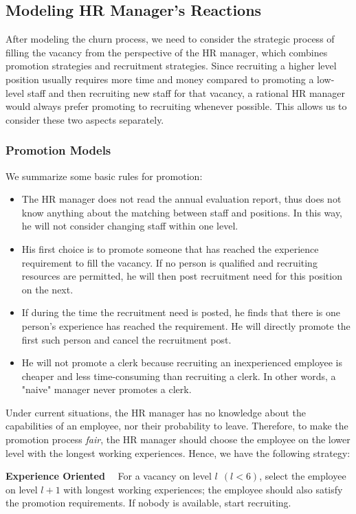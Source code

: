 \documentclass[tcn = 37075, sheet = false, abstract = false]{mcmthesis}
\begin{document}
	\subsection{Modeling HR Manager's Reactions}
	
	After modeling the churn process, we need to consider the strategic process of filling the vacancy from the perspective of the HR manager, which combines promotion strategies and recruitment strategies. Since recruiting a higher level position usually requires more time and money compared to promoting a low-level staff and then recruiting new staff for that vacancy, a rational HR manager would always prefer promoting to recruiting whenever possible. This allows us to consider these two aspects separately.
	
	\subsubsection{Promotion Models}
	We summarize some basic rules for promotion:
	\begin{itemize}
		\item The HR manager does not read the annual evaluation report, thus does not know anything about the matching between staff and positions. In this way, he will not consider changing staff within one level.
		\item His first choice is to promote someone that has reached the experience requirement to fill the vacancy. If no person is qualified and recruiting resources are permitted, he will then post recruitment need for this position on the next.
		\item If during the time the recruitment need is posted, he finds that there is one person's experience has reached the requirement. He will directly promote the first such person and cancel the recruitment post.
		\item He will not promote a clerk because recruiting an inexperienced employee is cheaper and less time-consuming than recruiting a clerk. In other words, a "naive" manager never promotes a clerk.
	\end{itemize}
	
	Under current situations, the HR manager has no knowledge about the capabilities of an employee, nor their probability to leave. Therefore, to make the promotion process \textit{fair}, the HR manager should choose the employee on the lower level with the longest working experiences. Hence, we have the following strategy:
	
	
	\noindent \textbf{Experience Oriented} \ \ For a vacancy on level $l ~~ (l < 6)$, select the employee on level $l+1$ with longest working experiences; the employee should also satisfy the promotion requirements. If nobody is available, start recruiting.
	
\end{document}
